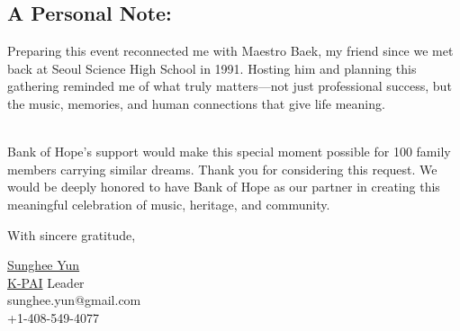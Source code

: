 \documentclass[11pt,letterpaper]{article}
\begin{document}
\subsection*{A Personal Note:}

Preparing this event reconnected me with Maestro Baek, my friend since we met back at Seoul Science High School in 1991. Hosting him and planning this gathering reminded me of what truly matters---not just professional success, but the music, memories, and human connections that give life meaning.

\ \\
Bank of Hope's support would make this special moment possible for 100 family members carrying similar dreams.
Thank you for considering this request. We would be deeply honored to have Bank of Hope as our partner in creating this meaningful celebration of music, heritage, and community.

\vspace{0.3cm}
\noindent
With sincere gratitude,

\vspace{0.5cm}
\noindent
\href{https://sungheeyun.github.io/}{Sunghee Yun}\\
\href{https://k-privateai.github.io/}{K-PAI} Leader\\
sunghee.yun@gmail.com\\
+1-408-549-4077
\end{document}

